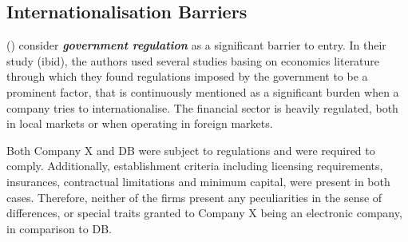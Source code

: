 \documentclass[11pt,a4paper]{article}
\begin{document}
{{{\subsection{Internationalisation Barriers}
\label{int_barriers}
 \par



 \citeauthor{karakayaBarriersEntryMarket1989} (\citeyear{karakayaBarriersEntryMarket1989}) consider \textbf{\textit{government regulation}} as a significant barrier to entry. In their study (ibid), the authors used several studies basing on economics literature through which they found regulations imposed by the government to be a prominent factor, that is continuously mentioned as a significant burden when a company tries to internationalise.  The financial sector is heavily regulated, both in local markets or when operating in foreign markets.\par
Both Company X and DB were subject to regulations and were required to comply. Additionally, establishment criteria including licensing requirements, insurances, contractual limitations and minimum capital, were present in both cases. Therefore, neither of the firms present any peculiarities in the sense of differences, or special traits granted to Company X being an electronic company, in comparison to DB. \par

}}}
\end{document}
